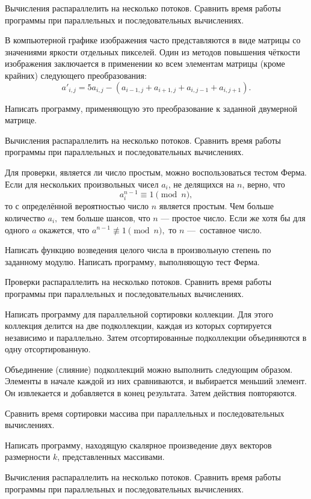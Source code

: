 Вычисления распараллелить на несколько потоков. Сравнить время работы
программы при параллельных и последовательных вычислениях.

\task В компьютерной графике изображения часто представляются в виде
матрицы со значениями яркости отдельных пикселей. Один из методов
повышения чёткости изображения
заключается в применении ко всем элементам матрицы (кроме крайних)
следующего преобразования:
\[
a'_{i,j} = 5a_{i,j} - \left(
  a_{i-1, j} + a_{i+1, j} + a_{i, j-1} + a_{i, j+1}
\right).
\]

Написать программу, применяющую это преобразование к заданной
двумерной матрице.

Вычисления распараллелить на несколько потоков. Сравнить время работы
программы при параллельных и последовательных вычислениях.

\task Для проверки, является ли число простым, можно воспользоваться
тестом Ферма. Если для нескольких
произвольных чисел $a_i$, не делящихся на $n$, верно, что
\[
a_i^{n-1} \equiv 1 \pmod n,
\]
то с определённой вероятностью число $n$ является простым. Чем больше
количество $a_i,$ тем больше шансов, что $n$ — простое число. Если же
хотя бы для одного $a$ окажется, что $a^{n-1}\not\equiv1 \pmod n,$ то
$n$ — составное число.

Написать функцию возведения целого числа в произвольную степень по
заданному модулю. Написать программу, выполняющую тест Ферма.

Проверки распараллелить на несколько потоков. Сравнить время работы
программы при параллельных и последовательных вычислениях.

\task Написать программу для параллельной сортировки коллекции. Для
этого коллекция делится на две подколлекции, каждая из которых
сортируется независимо и параллельно. Затем отсортированные подколлекции
объединяются в одну отсортированную.

Объединение (слияние) подколлекций можно выполнить следующим
образом. Элементы в начале каждой из них сравниваются, и выбирается
меньший элемент. Он извлекается и добавляется в конец
результата. Затем действия повторяются.

Сравнить время сортировки массива при параллельных и последовательных
вычислениях.

\task Написать программу, находящую скалярное произведение двух
векторов размерности $k$, представленных массивами.

Вычисления распараллелить на несколько потоков. Сравнить время работы
программы при параллельных и последовательных вычислениях.


